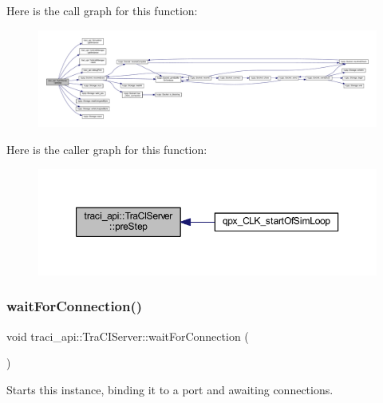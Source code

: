 Here is the call graph for this function\+:\nopagebreak
\begin{figure}[H]
\begin{center}
\leavevmode
\includegraphics[width=350pt]{classtraci__api_1_1_tra_c_i_server_a8cd79e7da542e4abccc75d4933331d20_cgraph}
\end{center}
\end{figure}
Here is the caller graph for this function\+:\nopagebreak
\begin{figure}[H]
\begin{center}
\leavevmode
\includegraphics[width=350pt]{classtraci__api_1_1_tra_c_i_server_a8cd79e7da542e4abccc75d4933331d20_icgraph}
\end{center}
\end{figure}
\mbox{\label{classtraci__api_1_1_tra_c_i_server_ac9cc474ec4ae6277c82cbf80f212852e}} 
\subsubsection{\texorpdfstring{wait\+For\+Connection()}{waitForConnection()}}
{\footnotesize\ttfamily void traci\+\_\+api\+::\+Tra\+C\+I\+Server\+::wait\+For\+Connection (\begin{DoxyParamCaption}{ }\end{DoxyParamCaption})}



Starts this instance, binding it to a port and awaiting connections. 

